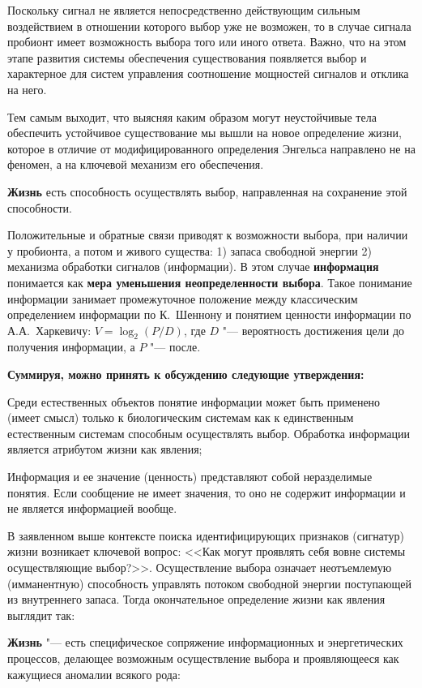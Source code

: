 \documentclass[12pt,a4paper,oneside]{book}
\begin{document}
Поскольку сигнал не является непосредственно действующим сильным воздействием в отношении которого выбор уже не возможен, то в случае сигнала пробионт имеет возможность выбора того или иного ответа. Важно, что на этом этапе развития системы обеспечения существования появляется выбор и характерное для систем управления соотношение мощностей сигналов и отклика на него.

Тем самым выходит, что выясняя каким образом могут неустойчивые тела обеспечить устойчивое существование мы вышли на новое определение жизни, которое в отличие от модифицированного определения Энгельса направлено не на феномен, а на ключевой механизм его обеспечения.

\textbf{Жизнь} есть способность осуществлять выбор, направленная на сохранение этой способности.

Положительные и обратные связи приводят к возможности выбора, при наличии у пробионта, а потом и живого существа: 1) запаса свободной энергии 2) механизма обработки сигналов (информации). В этом случае \textbf{информация} понимается как \textbf{мера уменьшения неопределенности выбора}. Такое понимание информации занимает промежуточное положение между классическим определением информации по К.~Шеннону и понятием ценности информации по А.А.~Харкевичу: $V = \log_2 (P/D)$, где $D$ "--- вероятность достижения цели до получения информации, а $P$ "--- после.

\textbf{Суммируя, можно принять к обсуждению следующие утверждения:}

Среди естественных объектов понятие информации может быть применено (имеет смысл) только к биологическим системам как к единственным естественным системам способным осуществлять выбор. Обработка информации является атрибутом жизни как явления;

Информация и ее значение (ценность) представляют собой неразделимые понятия. Если сообщение не имеет значения, то оно не содержит информации и не является информацией вообще.

В заявленном выше контексте поиска идентифицирующих признаков (сигнатур) жизни возникает ключевой вопрос: <<Как могут проявлять себя вовне системы осуществляющие выбор?>>. Осуществление выбора означает неотъемлемую (имманентную) способность управлять потоком свободной энергии поступающей из внутреннего запаса. Тогда окончательное определение жизни как явления выглядит так:

\textbf{Жизнь} "--- есть специфическое сопряжение информационных и энергетических процессов, делающее возможным осуществление выбора и проявляющееся как кажущиеся аномалии всякого рода:
\end{document}
